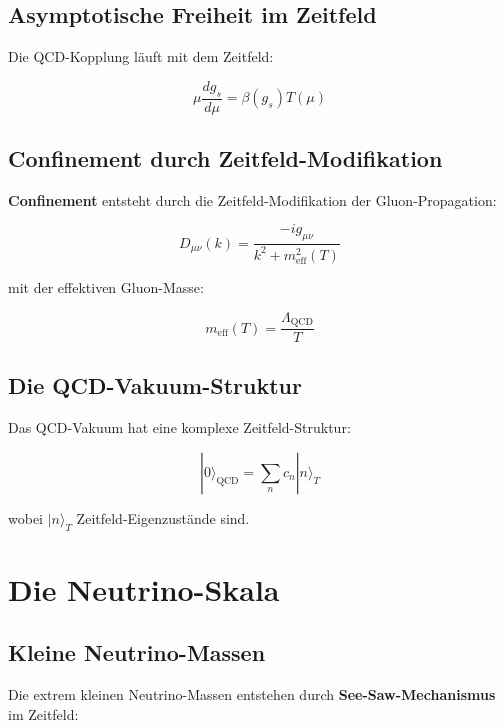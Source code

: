 \documentclass[12pt,a4paper]{report}
\begin{document}
	\subsection{Asymptotische Freiheit im Zeitfeld}
	
	Die QCD-Kopplung läuft mit dem Zeitfeld:
	
	\begin{equation}
		\mu\frac{dg_s}{d\mu} = \beta(g_s)T(\mu)
	\end{equation}
	
	\subsection{Confinement durch Zeitfeld-Modifikation}
	
	\textbf{Confinement} entsteht durch die Zeitfeld-Modifikation der Gluon-Propagation:
	
	\begin{equation}
		D_{\mu\nu}(k) = \frac{-ig_{\mu\nu}}{k^2 + m_{\text{eff}}^2(T)}
	\end{equation}
	
	mit der effektiven Gluon-Masse:
	
	\begin{equation}
		m_{\text{eff}}(T) = \frac{\Lambda_{\text{QCD}}}{T}
	\end{equation}
	
	\subsection{Die QCD-Vakuum-Struktur}
	
	Das QCD-Vakuum hat eine komplexe Zeitfeld-Struktur:
	
	\begin{equation}
		|0\rangle_{\text{QCD}} = \sum_n c_n |n\rangle_T
	\end{equation}
	
	wobei $|n\rangle_T$ Zeitfeld-Eigenzustände sind.
	
	\section{Die Neutrino-Skala}
	
	\subsection{Kleine Neutrino-Massen}
	
	Die extrem kleinen Neutrino-Massen entstehen durch \textbf{See-Saw-Mechanismus} im Zeitfeld:
	
\end{document}
